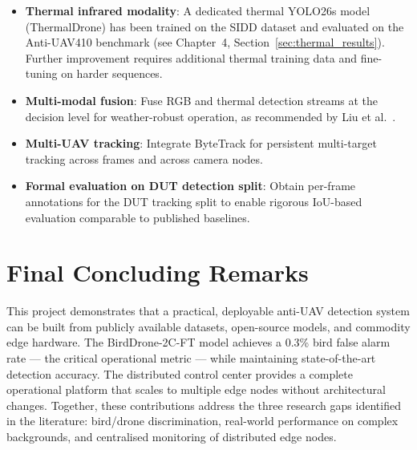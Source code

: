 \documentclass[12pt,a4paper]{report}
\begin{document}
\begin{itemize}
  \item \textbf{Thermal infrared modality}: A dedicated thermal YOLO26s
        model (ThermalDrone) has been trained on the SIDD dataset and
        evaluated on the Anti-UAV410 benchmark (see Chapter~4,
        Section~\ref{sec:thermal_results}). Further improvement requires
        additional thermal training data and fine-tuning on harder sequences.
  \item \textbf{Multi-modal fusion}: Fuse RGB and thermal detection streams
        at the decision level for weather-robust operation, as recommended
        by Liu et al.~\cite{liu2024survey}.
  \item \textbf{Multi-UAV tracking}: Integrate ByteTrack for persistent
        multi-target tracking across frames and across camera nodes.
  \item \textbf{Formal evaluation on DUT detection split}: Obtain per-frame
        annotations for the DUT tracking split to enable rigorous IoU-based
        evaluation comparable to published baselines.
\end{itemize}

\section{Final Concluding Remarks}

This project demonstrates that a practical, deployable anti-UAV detection
system can be built from publicly available datasets, open-source models,
and commodity edge hardware. The BirdDrone-2C-FT model achieves a 0.3\%
bird false alarm rate --- the critical operational metric --- while
maintaining state-of-the-art detection accuracy. The distributed control
center provides a complete operational platform that scales to multiple
edge nodes without architectural changes. Together, these contributions
address the three research gaps identified in the literature: bird/drone
discrimination, real-world performance on complex backgrounds, and
centralised monitoring of distributed edge nodes.
\end{document}
